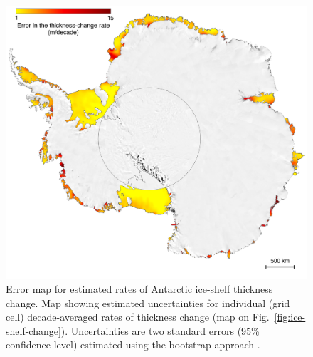 \begin{figure}[!h]
  \centering
  \includegraphics[width=\textwidth]{img/Sup4_error_review_v6.png}
  \caption[Error map for estimated rates of thickness change]{
Error map for estimated rates of Antarctic ice-shelf thickness change. Map showing estimated uncertainties for individual (grid cell) decade-averaged rates of thickness change (map on Fig.~\ref{fig:ice-shelf-change}). Uncertainties are two standard errors (95\% confidence level) estimated using the bootstrap approach \parencite[see text;][]{Efron1993}.
  }
  \label{c3f8}
\end{figure}


